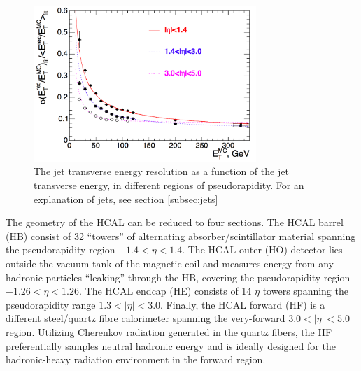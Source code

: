  \begin{figure}
	\centering
	\includegraphics[width=0.75\textwidth]{detector/figs/jetEnergyRes}
	\renewcommand{\baselinestretch}{1.0}
	\caption[The jet transverse energy resolution as a function of the jet transverse energy, in different regions of pseudorapidity.]{The jet transverse energy resolution as a function of the jet transverse energy, in different regions of pseudorapidity. For an explanation of jets, see section \ref{subsec:jets}}
	\label{fig:hcalSigma}
\end{figure}

The geometry of the HCAL can be reduced to four sections. The HCAL barrel (HB) consist of 32 ``towers'' of alternating absorber/scintillator material spanning the pseudorapidity region $-1.4<\eta<1.4$. The HCAL outer (HO) detector lies outside the vacuum tank of the magnetic coil and measures energy from any hadronic particles ``leaking'' through the HB, covering the pseudorapidity region $-1.26<\eta<1.26$. The HCAL endcap (HE) consists of 14 $\eta$ towers spanning the pseudorapidity range $1.3<|\eta|<3.0$. Finally, the HCAL forward (HF) is a different steel/quartz fibre calorimeter spanning the very-forward $3.0<|\eta|<5.0$ region. Utilizing Cherenkov radiation generated in the quartz fibers, the HF preferentially samples neutral hadronic energy and is ideally designed for the hadronic-heavy radiation environment in the forward region.

